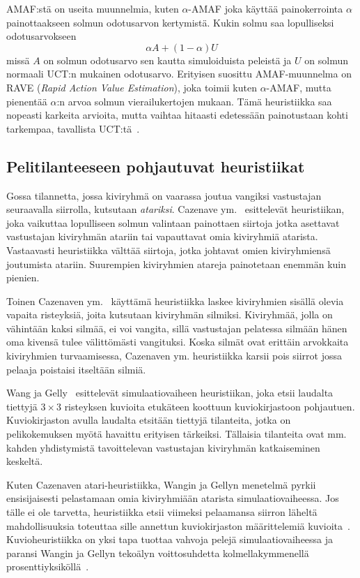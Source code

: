 \documentclass[12pt,finnish]{tktltiki2}
\theoremstyle{definition}
\theoremstyle{remark}
\begin{document}
AMAF:stä on useita muunnelmia, kuten $\alpha$-AMAF joka käyttää painokerrointa $\alpha$ painottaakseen solmun odotusarvon kertymistä. Kukin solmu saa lopulliseksi odotusarvokseen
\begin{equation}
\alpha A + (1 - \alpha)U
\end{equation}
missä $A$ on solmun odotusarvo sen kautta simuloiduista peleistä ja $U$ on solmun normaali UCT:n mukainen odotusarvo. Erityisen suosittu AMAF-muunnelma on RAVE (\textit{Rapid Action Value Estimation}), joka toimii kuten $\alpha$-AMAF, mutta pienentää $\alpha$:n arvoa solmun vierailukertojen mukaan. Tämä heuristiikka saa nopeasti karkeita arvioita, mutta vaihtaa hitaasti edetessään painotustaan kohti tarkempaa, tavallista UCT:tä~\cite{browne}.

\subsection{Pelitilanteeseen pohjautuvat heuristiikat}

Gossa tilannetta, jossa kiviryhmä on vaarassa joutua vangiksi vastustajan seuraavalla siirrolla, kutsutaan \textit{atariksi}. Cazenave ym.~\cite{cazenaveatari} esittelevät heuristiikan, joka vaikuttaa lopulliseen solmun valintaan painottaen siirtoja jotka asettavat vastustajan kiviryhmän atariin tai vapauttavat omia kiviryhmiä atarista. Vastaavasti heuristiikka välttää siirtoja, jotka johtavat omien kiviryhmiensä joutumista atariin. Suurempien kiviryhmien atareja painotetaan enemmän kuin pienien.

Toinen Cazenaven ym.~\cite{cazenave} käyttämä heuristiikka laskee kiviryhmien sisällä olevia vapaita risteyksiä, joita kutsutaan kiviryhmän silmiksi. Kiviryhmää, jolla on vähintään kaksi silmää, ei voi vangita, sillä vastustajan pelatessa silmään hänen oma kivensä tulee välittömästi vangituksi. Koska silmät ovat erittäin arvokkaita kiviryhmien turvaamisessa, Cazenaven ym. heuristiikka karsii pois siirrot jossa pelaaja poistaisi itseltään silmiä.

Wang ja Gelly~\cite{wanggelly} esittelevät simulaatiovaiheen heuristiikan, joka etsii laudalta tiettyjä $3\times 3$ risteyksen kuvioita etukäteen koottuun kuviokirjastoon pohjautuen. Kuviokirjaston avulla laudalta etsitään tiettyjä tilanteita, jotka on pelikokemuksen myötä havaittu erityisen tärkeiksi. Tällaisia tilanteita ovat mm. kahden yhdistymistä tavoittelevan vastustajan kiviryhmän katkaiseminen keskeltä.

Kuten Cazenaven atari-heuristiikka, Wangin ja Gellyn menetelmä pyrkii ensisijaisesti pelastamaan omia kiviryhmiään atarista simulaatiovaiheessa. Jos tälle ei ole tarvetta, heuristiikka etsii viimeksi pelaamansa siirron läheltä mahdollisuuksia toteuttaa sille annettun kuviokirjaston määrittelemiä kuvioita~\cite{wanggelly}. Kuvioheuristiikka on yksi tapa tuottaa vahvoja pelejä simulaatiovaiheessa ja paransi Wangin ja Gellyn tekoälyn voittosuhdetta kolmellakymmenellä prosenttiyksiköllä~\cite{wanggelly}.
\end{document}

